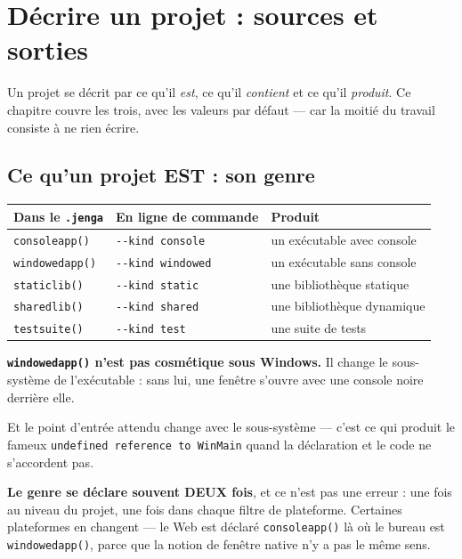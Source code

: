 \chapter{Décrire un projet : sources et sorties}

Un projet se décrit par ce qu'il \emph{est}, ce qu'il \emph{contient} et ce qu'il
\emph{produit}. Ce chapitre couvre les trois, avec les valeurs par défaut --- car
la moitié du travail consiste à ne rien écrire.

\section{Ce qu'un projet EST : son genre}

\begin{center}
\begin{tabular}{@{}lll@{}}
\toprule
\textbf{Dans le \texttt{.jenga}} & \textbf{En ligne de commande} & \textbf{Produit} \\
\midrule
\texttt{consoleapp()} & \texttt{-{}-kind console} & un exécutable avec console \\
\texttt{windowedapp()} & \texttt{-{}-kind windowed} & un exécutable sans console \\
\texttt{staticlib()} & \texttt{-{}-kind static} & une bibliothèque statique \\
\texttt{sharedlib()} & \texttt{-{}-kind shared} & une bibliothèque dynamique \\
\texttt{testsuite()} & \texttt{-{}-kind test} & une suite de tests \\
\bottomrule
\end{tabular}
\end{center}

\begin{nkretenir}
\textbf{\texttt{windowedapp()} n'est pas cosmétique sous Windows.} Il change le
sous-système de l'exécutable : sans lui, une fenêtre s'ouvre avec une console
noire derrière elle.

Et le point d'entrée attendu change avec le sous-système --- c'est ce qui produit
le fameux \texttt{undefined reference to WinMain} quand la déclaration et le code
ne s'accordent pas.
\end{nkretenir}

\begin{nkretenir}
\textbf{Le genre se déclare souvent DEUX fois}, et ce n'est pas une erreur :
une fois au niveau du projet, une fois dans chaque filtre de plateforme.
Certaines plateformes en changent --- le Web est déclaré \texttt{consoleapp()}
là où le bureau est \texttt{windowedapp()}, parce que la notion de fenêtre
native n'y a pas le même sens.
\end{nkretenir}

